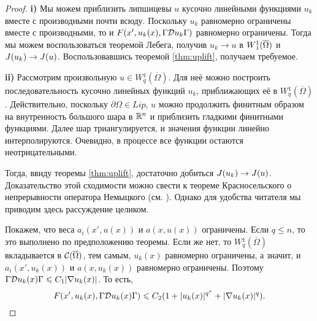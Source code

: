 \begin{proof}
\textbf{\textup{i)}} Мы можем приблизить липшицевы $u$ кусочно линейными функциями $u_k$ вместе с производными почти всюду.
Поскольку $u_k$ равномерно ограничены вместе с производными,
то и $F(x', u_k(x), \norm{\mathcal{D} u_k})$ равномерно ограничены.
Тогда мы можем воспользоваться теоремой Лебега, получив $u_k \to u$ в $\W(\overline{\Omega})$ и $J( u_k ) \to J( u )$.
Воспользовавшись теоремой \ref{thm:uplift}, получаем требуемое.

\textbf{\textup{ii)}} Рассмотрим произвольную $u \in W{}^1_q(\overline{\Omega})$.
Для неё можно построить последовательность кусочно линейных функций $u_k$, приближающих её в $W{}^1_q(\overline{\Omega})$.
Действительно, поскольку $\partial \Omega \in Lip$,
$u$ можно продолжить финитным образом на внутренность большого шара в $\mathbb R^n$
и приблизить гладкими финитными функциями.
Далее шар триангулируется, и значения функции линейно интерполируются.
Очевидно, в процессе все функции остаются неотрицательными.

Тогда, ввиду теоремы \ref{thm:uplift}, достаточно добиться $J( u_k ) \to J( u )$.
Доказательство этой сходимости можно свести к теореме Красносельского о непрерывности
оператора Немыцкого (см. \cite[гл. 5, ]{Krasnoselsky}).
Однако для удобства читателя мы приводим здесь рассуждение целиком.

Покажем, что веса $a_i(x', u(x))$ и $a(x, u(x))$ ограничены.
Если $q \le n$, то это выполнено по предположению теоремы. Если же нет, то $W{}^1_q(\overline{\Omega})$ вкладывается в $\Cont(\overline{\Omega})$,
тем самым, $u_k(x)$ равномерно ограничены, а значит, и $a_i(x', u_k(x))$ и $a(x, u_k(x))$ равномерно ограничены.
Поэтому $\norm{ \mathcal{D} u_k( x ) } \le C_1 |\nabla u_k( x )|$.
То есть,
$$F( x', u_k( x ), \norm{ \mathcal{D} u_k( x ) } ) \le C_2 ( 1 + |u_k( x )|^{q^*} + |\nabla u_k( x )|^q ).$$



\end{proof}
